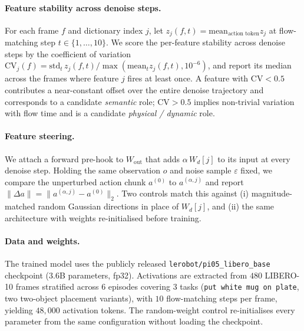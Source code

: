 \paragraph{Feature stability across denoise steps.}
For each frame $f$ and dictionary index $j$, let
$z_j(f,t) = \mathrm{mean}_{\text{action token}} z_j$ at flow-matching step
$t\in\{1,\dots,10\}$. We score the per-feature stability across denoise steps
by the coefficient of variation
$\mathrm{CV}_j(f) = \mathrm{std}_t\,z_j(f,t) / \max(\mathrm{mean}_t z_j(f,t),
10^{-6})$,
and report its median across the frames where feature $j$ fires at least once.
A feature with $\mathrm{CV}{<}0.5$ contributes a near-constant offset over the
entire denoise trajectory and corresponds to a candidate \emph{semantic} role;
$\mathrm{CV}{>}0.5$ implies non-trivial variation with flow time and is a
candidate \emph{physical / dynamic} role.

\paragraph{Feature steering.}
We attach a forward pre-hook to $W_\text{out}$ that adds
$\alpha\,W_d[j]$ to its input at every denoise step.
Holding the same observation $o$ and noise sample $\varepsilon$ fixed, we
compare the unperturbed action chunk $a^{(0)}$ to $a^{(\alpha,j)}$ and report
$\|\Delta a\| = \|a^{(\alpha,j)} - a^{(0)}\|_2$. Two controls match this against
(i) magnitude-matched random Gaussian directions in place of $W_d[j]$, and
(ii) the same architecture with weights re-initialised before training.

\paragraph{Data and weights.}
The trained model uses the publicly released \texttt{lerobot/pi05\_libero\_base}
checkpoint ($3.6$B parameters, fp32). Activations are extracted from $480$
LIBERO-10 frames stratified across $6$ episodes covering $3$ tasks
(\texttt{put white mug on plate}, two two-object placement variants), with $10$
flow-matching steps per frame, yielding $48{,}000$ activation tokens. The
random-weight control re-initialises every parameter from the same
configuration without loading the checkpoint.
